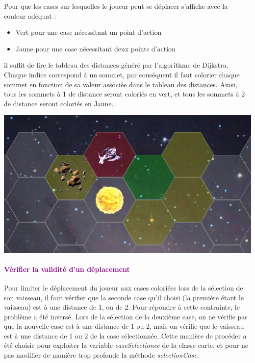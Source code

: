 \documentclass{report}
\begin{document}
			
			Pour que les cases sur lesquelles le joueur peut se déplacer s'affiche avec la couleur adéquat : 
			\begin{itemize}
				\item Vert pour une case nécessitant un point d'action
				\item Jaune pour une case nécessitant deux points d'action
			\end{itemize}
			il suffit de lire le tableau des distances généré par l'algorithme de Dijkstra. Chaque indice correspond à un sommet, par conséquent il faut colorier chaque sommet en fonction de sa valeur associée dans le tableau des distances. Ainsi, tous les sommets à 1 de distance seront coloriés en vert, et tous les sommets à 2 de distance seront coloriés en Jaune.\\[2cm]
			\begin{center} 
      
          \includegraphics[scale=0.75]{Images/Coloration.png} 
     
      \end{center}
      
      \paragraph{\textcolor{purple}{Vérifier la validité d'un déplacement}}
      Pour limiter le déplacement du joueur aux cases coloriées lors de la sélection de son vaisseau, il faut vérifier que la seconde case qu'il choisi (la première étant le vaisseau) est à une distance de 1, ou de 2.
      Pour répondre à cette contrainte, le problème a été inversé. Lors de la sélection de la deuxième case, on ne vérifie pas que la nouvelle case est à une distance de 1 ou 2, mais on vérifie que le vaisseau est à une distance de 1 ou 2 de la case sélectionnée. Cette manière de procéder a été choisie pour exploiter la variable \emph{caseSelectionee} de la classe carte, et pour ne pas modifier de manière trop profonde la méthode \emph{selectionCase}.
      
\end{document}
